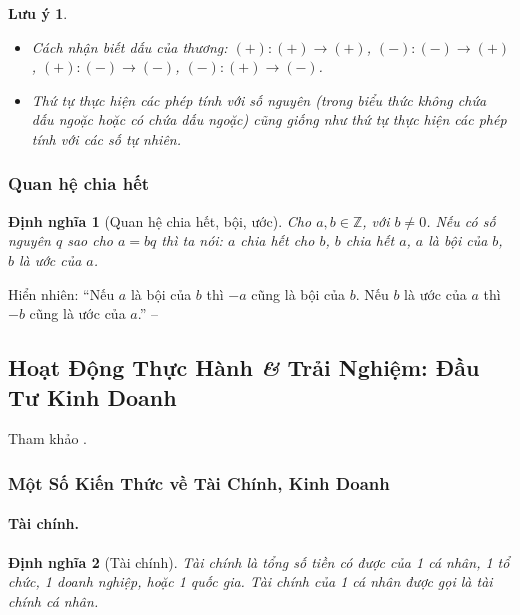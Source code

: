 \documentclass{article}
\numberwithin{equation}{section}
\newtheorem{dinhnghia}{Định nghĩa}[section]
\newtheorem{luuy}{Lưu ý}[section]
\begin{document}
\begin{luuy}
	\begin{itemize}
		\item Cách nhận biết dấu của thương: $(+):(+)\to(+)$, $(-):(-)\to(+)$, $(+):(-)\to(-)$, $(-):(+)\to(-)$.
		\item Thứ tự thực hiện các phép tính với số nguyên (trong biểu thức không chứa dấu ngoặc hoặc có chứa dấu ngoặc) cũng giống như thứ tự thực hiện các phép tính với các số tự nhiên.
	\end{itemize}
\end{luuy}

\subsubsection{Quan hệ chia hết}

\begin{dinhnghia}[Quan hệ chia hết, bội, ước]
	Cho $a,b\in\mathbb{Z}$, với $b\ne 0$. Nếu có số nguyên $q$ sao cho $a = bq$ thì ta nói: $a$ \emph{chia hết cho} $b$, $b$ \emph{chia hết} $a$, $a$ là \emph{bội} của $b$, $b$ là \emph{ước} của $a$.
\end{dinhnghia}
Hiển nhiên: ``Nếu $a$ là bội của $b$ thì $-a$ cũng là bội của $b$. Nếu $b$ là ước của $a$ thì $-b$ cũng là ước của $a$.'' -- \cite[p. 86]{SGK_Toan_6_Canh_Dieu_tap_1}


\subsection{Hoạt Động Thực Hành \textit{\&} Trải Nghiệm: Đầu Tư Kinh Doanh}
Tham khảo \cite[pp. 89--92]{SGK_Toan_6_Canh_Dieu_tap_1}.

\subsubsection{Một Số Kiến Thức về Tài Chính, Kinh Doanh}

\paragraph{Tài chính.}
\begin{dinhnghia}[Tài chính]
	\emph{Tài chính} là tổng số tiền có được của 1 cá nhân, 1 tổ chức, 1 doanh nghiệp, hoặc 1 quốc gia. Tài chính của 1 cá nhân được gọi là \emph{tài chính cá nhân}.
\end{dinhnghia}
\end{document}

